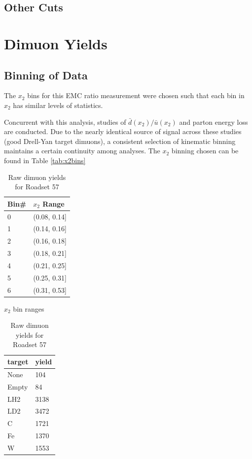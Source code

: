 \subsection{Other Cuts}

\section{Dimuon Yields}


\subsection{Binning of Data}

The $x_2$ bins for this EMC ratio measurement were chosen such that each
bin in $x_2$ has similar levels of statistics. 

Concurrent with this analysis, studies of $\bar{d}(x_2)/\bar{u}(x_2)$ and 
parton energy loss are conducted. Due to the nearly
identical source of signal across these studies (good Drell-Yan target
dimuons), a consistent selection of kinematic binning maintains a 
certain continuity among analyses. The $x_2$ binning chosen can be found in Table \ref{tab:x2bins}

\begin{table}
	\centering
	\setlength\tabcolsep{4pt}
\begin{minipage}{0.48\textwidth}
	\centering
	\begin{tabular}{ll}
		\toprule
		Bin\# & $x_2$ Range\\
		\midrule
		0 & (0.08, 0.14] \\
		1 & (0.14, 0.16] \\
		2 & (0.16, 0.18] \\
		3 & (0.18, 0.21] \\
		4 & (0.21, 0.25] \\
		5 & (0.25, 0.31] \\
		6 & (0.31, 0.53] \\
		\bottomrule
	\end{tabular}
	\caption{$x_2$ bin ranges}
	\label{tab:x2bins} 
\end{minipage}%
\hfill
\begin{minipage}{0.48\textwidth}
	\centering
	\begin{tabular}{ll}
		\toprule
		target & yield \\ 
		\midrule
		None   &  104 \\
		Empty  &  84 \\
		LH2    &  3138 \\
		LD2    &  3472 \\
		C      &  1721 \\ 
		Fe     &  1370 \\
		W      &  1553 \\
		\bottomrule
	\end{tabular}
	\caption{Raw dimuon yields for Roadset 57} 
	\label{tab:targyields} 
\end{minipage}
\end{table}

